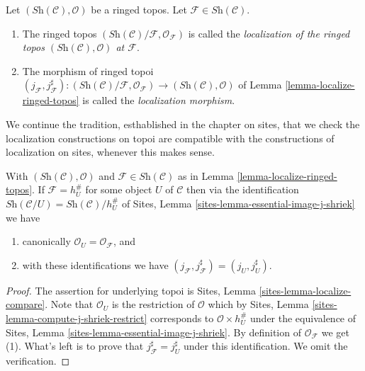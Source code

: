 \begin{definition}
\label{definition-localize-ringed-topos}
Let $(\textit{Sh}(\mathcal{C}), \mathcal{O})$ be a ringed topos.
Let $\mathcal{F} \in \textit{Sh}(\mathcal{C})$.
\begin{enumerate}
\item The ringed topos
$(\textit{Sh}(\mathcal{C})/\mathcal{F}, \mathcal{O}_{\mathcal{F}})$
is called the
{\it localization of the ringed topos
$(\textit{Sh}(\mathcal{C}), \mathcal{O})$ at $\mathcal{F}$}.
\item The morphism of ringed topoi
$(j_{\mathcal{F}}, j_{\mathcal{F}}^\sharp) :
(\textit{Sh}(\mathcal{C})/\mathcal{F}, \mathcal{O}_{\mathcal{F}})
\to
(\textit{Sh}(\mathcal{C}), \mathcal{O})$ of
Lemma \ref{lemma-localize-ringed-topos}
is called the {\it localization morphism}.
\end{enumerate}
\end{definition}

\noindent
We continue the tradition, esthablished in the chapter on sites, that we
check the localization constructions on topoi are compatible with the
constructions of localization on sites, whenever this makes sense.

\begin{lemma}
\label{lemma-localize-compare}
With
$(\textit{Sh}(\mathcal{C}), \mathcal{O})$ and
$\mathcal{F} \in \textit{Sh}(\mathcal{C})$ as in
Lemma \ref{lemma-localize-ringed-topos}.
If $\mathcal{F} = h_U^\#$ for some object $U$ of $\mathcal{C}$
then via the identification
$\textit{Sh}(\mathcal{C}/U) = \textit{Sh}(\mathcal{C})/h_U^\#$ of
Sites, Lemma \ref{sites-lemma-essential-image-j-shriek}
we have
\begin{enumerate}
\item canonically $\mathcal{O}_U = \mathcal{O}_{\mathcal{F}}$, and
\item with these identifications
we have $(j_{\mathcal{F}}, j_{\mathcal{F}}^\sharp) = (j_U, j_U^\sharp)$.
\end{enumerate}
\end{lemma}

\begin{proof}
The assertion for underlying topoi is
Sites, Lemma \ref{sites-lemma-localize-compare}.
Note that $\mathcal{O}_U$ is the restriction of $\mathcal{O}$
which by
Sites, Lemma \ref{sites-lemma-compute-j-shriek-restrict}
corresponds to $\mathcal{O} \times h_U^\#$ under the equivalence of
Sites, Lemma \ref{sites-lemma-essential-image-j-shriek}.
By definition of $\mathcal{O}_{\mathcal{F}}$ we get (1).
What's left is to prove that $j_{\mathcal{F}}^\sharp = j_U^\sharp$
under this identification. We omit the verification.
\end{proof}

